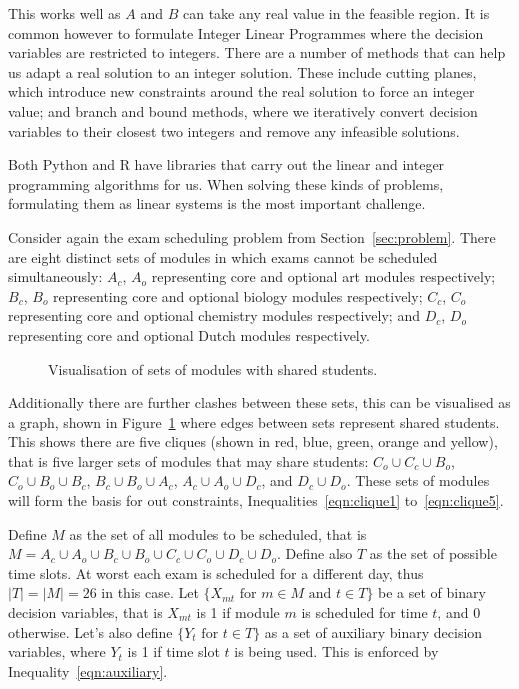 This works well as $A$ and $B$ can take any real value in the feasible region.
It is common however to formulate Integer Linear Programmes where the decision
variables are restricted to integers. There are a number of methods that can
help us adapt a real solution to an integer solution. These include cutting
planes, which introduce new constraints around the real solution to force an
integer value; and branch and bound methods, where we iteratively convert
decision variables to their closest two integers and remove any infeasible
solutions.

Both Python and R have libraries that carry out the linear and integer
programming algorithms for us. When solving these kinds of problems, formulating
them as linear systems is the most important challenge.

Consider again the exam scheduling problem from Section~\ref{sec:problem}.
There are eight distinct sets of modules in which exams cannot be scheduled
simultaneously: $A_c$, $A_o$ representing core and optional art modules
respectively; $B_c$, $B_o$ representing core and optional biology modules
respectively; $C_c$, $C_o$ representing core and optional chemistry modules
respectively; and $D_c$, $D_o$ representing core and optional Dutch modules
respectively.

\begin{figure}
\begin{center}

\end{center}
\caption{Visualisation of sets of modules with shared students.}
\label{fig:clashes}
\end{figure}

Additionally there are further clashes between these sets, this can be
visualised as a graph, shown in Figure~\ref{fig:clashes} where edges between
sets represent shared students.
This shows there are five cliques (shown in red, blue, green, orange and
yellow), that is five larger sets of modules that may share students:
$C_o \cup C_c \cup B_o$, $C_o \cup B_o \cup B_c$, $B_c \cup B_o \cup A_c$,
$A_c \cup A_o \cup D_c$, and $D_c \cup D_o$. These sets of modules will form the
basis for out constraints, Inequalities~\ref{eqn:clique1} to~\ref{eqn:clique5}.

Define $M$ as the set of all modules to be scheduled, that is
$M = A_c \cup A_o \cup B_c \cup B_o \cup C_c \cup C_o \cup D_c \cup D_o$.
Define also $T$ as the set of possible time slots. At worst each exam is
scheduled for a different day, thus $|T| = |M| = 26$ in this case.
Let $\{X_{mt} \text{ for } m \in M \text{ and } t \in T\}$ be a set of binary
decision variables, that is $X_{mt}$ is 1 if module $m$ is scheduled for time
$t$, and 0 otherwise.
Let's also define $\{Y_t \text{ for } t \in T\}$ as a set of auxiliary binary
decision variables, where $Y_t$ is 1 if time slot $t$ is being used. This is
enforced by Inequality~\ref{eqn:auxiliary}.

